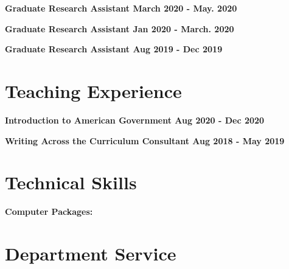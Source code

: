 \documentclass[margin]{res}
\newcommand{\fullhrulefill}{%
  \hspace*{-\sectionwidth}\hrulefill%
  }
\begin{document}
\begin{resume}
\textbf {Graduate Research Assistant \hfill {March 2020 - May. 2020} \\ }

\textbf {Graduate Research Assistant \hfill {Jan 2020 - March. 2020} \\ }

\textbf {Graduate Research Assistant \hfill {Aug 2019 - Dec 2019} \\ }


\fullhrulefill
\section {Teaching Experience}

\textbf {Introduction to American Government \hfill {Aug 2020 - Dec 2020} \\ }

\textbf {Writing Across the Curriculum Consultant \hfill {Aug 2018 - May 2019} \\ }

\fullhrulefill
\section{Technical Skills}
\textbf{Computer Packages:} 

\fullhrulefill
\section {Department Service}






\end{resume}
\(\)
\end{document}
